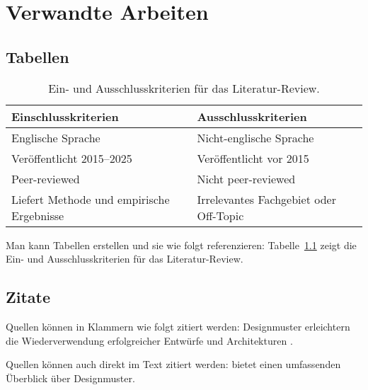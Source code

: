 \chapter{Verwandte Arbeiten}
\label{chap:related-work}

\section{Tabellen}

\begin{table}[htbp]
    \centering
    \caption{Ein- und Ausschlusskriterien für das Literatur-Review.}
    \label{table:review-criteria}
    \begin{tabularx}{1.0\textwidth}{>{\raggedright\arraybackslash}X>{\raggedright\arraybackslash}X}
        \toprule
        \textbf{Einschlusskriterien}              & \textbf{Ausschlusskriterien}           \\
        \midrule
        Englische Sprache                         & Nicht-englische Sprache                \\
        Veröffentlicht 2015–2025                  & Veröffentlicht vor 2015                \\
        Peer-reviewed                             & Nicht peer-reviewed                    \\
        Liefert Methode und empirische Ergebnisse & Irrelevantes Fachgebiet oder Off-Topic \\
        \bottomrule
    \end{tabularx}
\end{table}

Man kann Tabellen erstellen und sie wie folgt referenzieren: Tabelle~\ref{table:review-criteria} zeigt die Ein- und Ausschlusskriterien für das Literatur-Review.

\section{Zitate}

Quellen können in Klammern wie folgt zitiert werden: Designmuster erleichtern die Wiederverwendung erfolgreicher Entwürfe und Architekturen \autocite{gamma1994design}.

Quellen können auch direkt im Text zitiert werden: \textcite{gamma1994design} bietet einen umfassenden Überblick über Designmuster.
